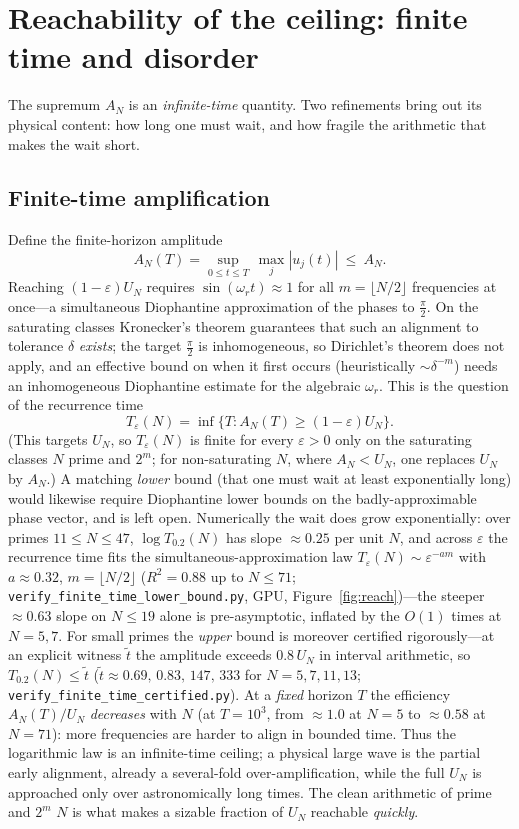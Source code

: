 \section{Reachability of the ceiling: finite time and disorder}\label{sec:reach}

The supremum $A_N$ is an \emph{infinite-time} quantity. Two refinements bring out its physical content:
how long one must wait, and how fragile the arithmetic that makes the wait short.

\subsection{Finite-time amplification}
Define the finite-horizon amplitude
\[
  A_N(T)=\sup_{0\le t\le T}\,\max_j|u_j(t)|\ \le\ A_N .
\]
Reaching
$(1-\varepsilon)U_N$ requires $\sin(\omega_r t)\approx1$ for all $m=\lfloor N/2\rfloor$ frequencies at
once---a simultaneous Diophantine approximation of the phases to $\tfrac\pi2$. On the saturating classes
Kronecker's theorem guarantees that such an alignment to tolerance $\delta$ \emph{exists}; the target
$\tfrac\pi2$ is inhomogeneous, so Dirichlet's theorem does not apply, and an effective bound on when it first
occurs (heuristically $\sim\delta^{-m}$) needs an inhomogeneous Diophantine estimate for the algebraic
$\omega_r$. This is the question of the recurrence time
\[
  T_\varepsilon(N)=\inf\{T:A_N(T)\ge(1-\varepsilon)U_N\}.
\]
(This targets $U_N$, so $T_\varepsilon(N)$ is finite for every $\varepsilon>0$ only on the saturating classes $N$
prime and $2^m$;
for non-saturating $N$, where $A_N<U_N$, one replaces $U_N$ by $A_N$.) A matching \emph{lower} bound
(that one must wait at least exponentially long) would likewise require Diophantine lower bounds on the
badly-approximable phase vector, and is left open. Numerically the wait does grow exponentially: over primes $11\le N\le47$, $\log T_{0.2}(N)$ has slope
$\approx0.25$ per unit $N$, and across $\varepsilon$ the recurrence time fits the simultaneous-approximation
law $T_\varepsilon(N)\sim\varepsilon^{-a m}$ with $a\approx0.32$, $m=\lfloor N/2\rfloor$ ($R^2=0.88$ up to
$N\le71$; \texttt{verify\_finite\_time\_lower\_bound.py}, GPU, Figure~\ref{fig:reach})---the steeper
$\approx0.63$ slope on $N\le19$ alone is pre-asymptotic, inflated by the $O(1)$ times at $N=5,7$. For small
primes the \emph{upper} bound is moreover certified rigorously---at an explicit witness $\tilde t$ the
amplitude exceeds $0.8\,U_N$ in interval arithmetic, so $T_{0.2}(N)\le\tilde t$
($\tilde t\approx0.69,\,0.83,\,147,\,333$ for $N=5,7,11,13$; \texttt{verify\_finite\_time\_certified.py}). At
a \emph{fixed} horizon $T$ the efficiency $A_N(T)/U_N$ \emph{decreases} with $N$ (at $T=10^3$, from
$\approx1.0$ at $N=5$ to $\approx0.58$ at $N=71$): more frequencies are harder to align in bounded time. Thus the logarithmic law is an infinite-time ceiling; a physical large wave is the
partial early alignment, already a several-fold over-amplification, while the full $U_N$ is approached
only over astronomically long times. The clean arithmetic of prime and $2^m$ $N$ is what makes a sizable
fraction of $U_N$ reachable \emph{quickly}.

